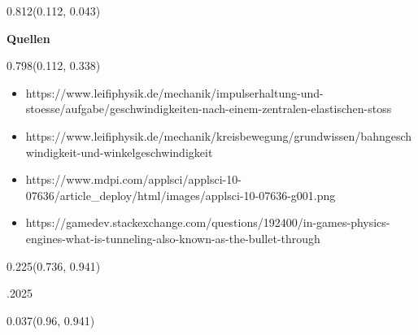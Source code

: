 \documentclass[aspectratio=169]{beamer}
\begin{document}
\begin{frame}[fragile]
  \begin{textblock}{0.812}(0.112, 0.043)
    \begin{minipage}[t][0.151\paperheight]{\linewidth}
      \textbf{Quellen}
    \end{minipage}
  \end{textblock}
  
  \begin{textblock}{0.798}(0.112, 0.338)
    \begin{minipage}[t][0.537\paperheight]{\linewidth}
      \scriptsize
      \begin{itemize}
        \item https://www.leifiphysik.de/mechanik/impulserhaltung-und-stoesse/aufgabe/geschwindigkeiten-nach-einem-zentralen-elastischen-stoss
        \item https://www.leifiphysik.de/mechanik/kreisbewegung/grundwissen/bahngeschwindigkeit-und-winkelgeschwindigkeit
        \item https://www.mdpi.com/applsci/applsci-10-07636/article_deploy/html/images/applsci-10-07636-g001.png
        \item https://gamedev.stackexchange.com/questions/192400/in-games-physics-engines-what-is-tunneling-also-known-as-the-bullet-through
      \end{itemize}
    \end{minipage}
  \end{textblock}

  \begin{textblock}{0.225}(0.736, 0.941)
    \begin{minipage}[b][0.053\paperheight]{\linewidth}
      \raggedright
      \fontsize{3}{3.3}.2025
    \end{minipage}
  \end{textblock}

  \begin{textblock}{0.037}(0.96, 0.941)
    \begin{minipage}[b][0.053\paperheight]{\linewidth}
      \raggedright
      \fontsize{3}{3.3}
    \end{minipage}
  \end{textblock}
\end{frame}
\end{document}

